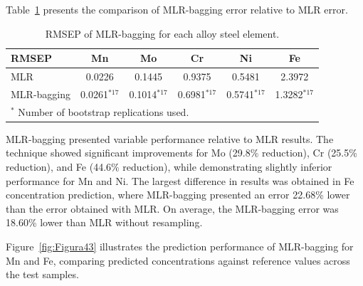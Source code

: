 \documentclass[12pt]{article}
\begin{document}
Table~\ref{tab:bagging_results} presents the comparison of MLR-bagging error relative to MLR error.

\begin{table}[H]
\centering
\caption{RMSEP of MLR-bagging for each alloy steel element.}
\label{tab:bagging_results}
\begin{tabular}{lccccc}
\toprule
RMSEP & Mn & Mo & Cr & Ni & Fe \\
\midrule
MLR & 0.0226 & 0.1445 & 0.9375 & 0.5481 & 2.3972 \\
MLR-bagging & 0.0261$^{*17}$ & 0.1014$^{*17}$ & 0.6981$^{*17}$ & 0.5741$^{*17}$ & 1.3282$^{*17}$ \\
\bottomrule
\multicolumn{6}{l}{\footnotesize $^*$ Number of bootstrap replications used.}
\end{tabular}
\end{table}

MLR-bagging presented variable performance relative to MLR results. The technique showed significant improvements for Mo (29.8\% reduction), Cr (25.5\% reduction), and Fe (44.6\% reduction), while demonstrating slightly inferior performance for Mn and Ni. The largest difference in results was obtained in Fe concentration prediction, where MLR-bagging presented an error 22.68\% lower than the error obtained with MLR. On average, the MLR-bagging error was 18.60\% lower than MLR without resampling.

Figure~\ref{fig:Figura43} illustrates the prediction performance of MLR-bagging for Mn and Fe, comparing predicted concentrations against reference values across the test samples.
\end{document}
